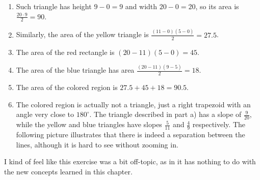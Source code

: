 \begin{enumerate}[label=\alph*)]
	\item Such triangle has height $9-0=9$ and width $20-0=20$, so its area is $\frac{20\cdot9}{2} = 90$.
	\item Similarly, the area of the yellow triangle is $\frac{(11-0)(5-0)}{2} = 27.5$.
	\item The area of the red rectangle is $(20-11)(5-0) = 45$.
	\item The area of the blue triangle has area $\frac{(20-11)(9-5)}{2} = 18$.
	\item The area of the colored region is $27.5 + 45 + 18 = 90.5$.
	\item The colored region is actually not a triangle, just a right trapezoid with an angle very close to $180^\circ$. The triangle described in part a) has a slope of $\frac{9}{20}$, while the yellow and blue triangles have slopes $\frac{5}{11}$ and $\frac{4}{9}$ respectively. The following picture illustrates that there is indeed a separation between the lines, although it is hard to see without zooming in.
	
	\centering{\texttt{[image: ./2A-14-2]}}
\end{enumerate}

I kind of feel like this exercise was a bit off-topic, as in it has nothing to do with the new concepts learned in this chapter.
